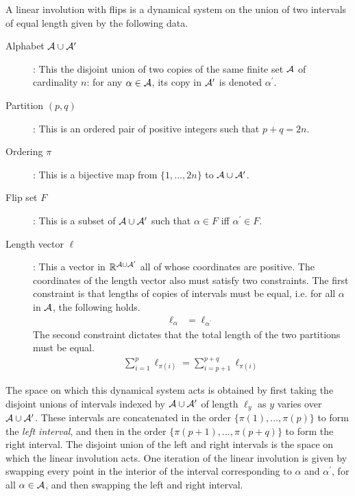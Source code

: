 \documentclass[12pt, reqno]{amsart}
\begin{document}
A linear involution with flips is a dynamical system on the union of two intervals of equal length given by the following data.
\begin{description}
\item[Alphabet $\mathcal{A} \cup \mathcal{A}^{\prime}$]: This the disjoint union of two copies of the same finite set $\mathcal{A}$ of cardinality $n$: for any $\alpha \in \mathcal{A}$, its copy in $\mathcal{A}^{\prime}$ is denoted $\alpha^{\prime}$.
\item[Partition $(p,q)$]: This is an ordered pair of positive integers such that $p+q = 2n$.
\item[Ordering $\pi$]: This is a bijective map from $\{1, \ldots, 2n\}$ to $\mathcal{A} \cup \mathcal{A}^{\prime}$.
\item[Flip set $F$]: This is a subset of $\mathcal{A} \cup \mathcal{A}^{\prime}$ such that $\alpha \in F$ iff $\alpha^{\prime} \in F$.
\item[Length vector $\ell$]: This a vector in $\mathbb{R}^{\mathcal{A} \cup \mathcal{A}^{\prime}}$ all of whose coordinates are positive.
  The coordinates of the length vector also must satisfy two constraints.
  The first constraint is that lengths of copies of intervals must be equal, i.e. for all $\alpha$ in $\mathcal{A}$, the following holds.
  \begin{align*}
    \ell_{\alpha} &= \ell_{\alpha^{\prime}}
  \end{align*}
  The second constraint dictates that the total length of the two partitions must be equal.
  \begin{align*}
    \sum_{i=1}^{p} \ell_{\pi(i)} = \sum_{i=p+1}^{p+q} \ell_{\pi(i)}
  \end{align*}
\end{description}
The space on which this dynamical system acts is obtained by first taking the disjoint unions of intervals indexed by $\mathcal{A} \cup \mathcal{A}^{\prime}$ of length $\ell_y$ as $y$ varies over $\mathcal{A} \cup \mathcal{A}^{\prime}$.
These intervals are concatenated in the order $\{\pi(1), \ldots, \pi(p)\}$ to form the \emph{left interval}, and then in the order $\{\pi(p+1), \ldots, \pi(p+q)\}$ to form the right interval.
The disjoint union of the left and right intervals is the space on which the linear involution acts.
One iteration of the linear involution is given by swapping every point in the interior of the interval corresponding to $\alpha$ and $\alpha^{\prime}$, for all $\alpha \in \mathcal{A}$, and then swapping the left and right interval.
\end{document}
